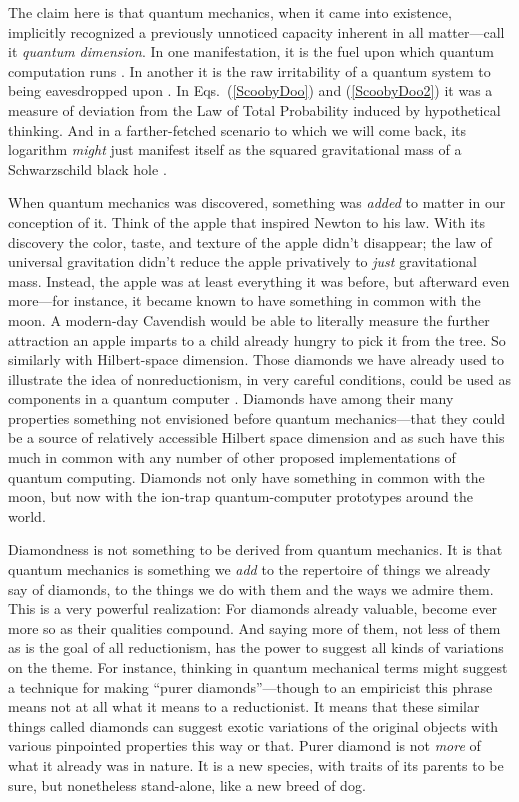 \documentclass[aps,pra,superscriptaddress,12pt,tightenlines,nofootinbib]{revtex4-2}
\begin{document}
The claim here is that quantum mechanics, when it came into existence, implicitly recognized a previously unnoticed capacity inherent in all matter---call it {\it quantum dimension}.  In one manifestation, it is the fuel upon which quantum computation runs \cite{Fuchs04b,BlumeKohout02}.  In another it is the raw irritability of a quantum system to being eavesdropped upon \cite{Fuchs03,Cerf02}.  In Eqs.~(\ref{ScoobyDoo}) and (\ref{ScoobyDoo2}) it was a measure of deviation from the Law of Total Probability induced by hypothetical thinking.  And in a farther-fetched scenario to which we will come back, its logarithm {\it might\/} just manifest itself as the squared gravitational mass of a Schwarzschild black hole \cite{Horowitz04,Gottesman04}.

When quantum mechanics was discovered, something was {\it added\/} to matter in our conception of it.  Think of the apple that inspired Newton to his law.  With its discovery the color, taste, and texture of the apple didn't disappear; the law of universal gravitation didn't reduce the apple privatively to {\it just\/} gravitational mass. Instead, the apple was at least everything it was before, but afterward even more---for instance, it became known to have something in common with the moon.  A modern-day Cavendish would be able to literally measure the fur\-ther attraction an apple imparts to a child already hungry to pick it from the tree.  So similarly with Hil\-bert-space dimension.  Those diamonds we have already used to illustrate the idea of nonreductionism, in very careful conditions, could be used as components in a quantum computer \cite{Prawer08}.  Diamonds have among their many properties something not envisioned before quantum mechanics---that they could be a source of relatively accessible Hilbert space dimension and as such have this much in common with any number of other proposed implementations of quantum computing.  Diamonds not only have something in common with the moon, but now with the ion-trap quantum-computer prototypes around the world.

Diamondness is not something to be derived from quantum mechanics.  It is that quantum mechanics is something we {\it add\/} to the repertoire of things we already say of diamonds, to the things we do with them and the ways we admire them.  This is a very powerful realization:  For diamonds already valuable, become ever more so as their qualities compound.  And saying more of them, not less of them as is the goal of all reductionism, has the power to suggest all kinds of variations on the theme.  For instance, thinking in quantum mechanical terms might suggest a technique for making ``purer diamonds''---though to an empiricist this phrase means not at all what it means to a reductionist.  It means that these similar things called diamonds can suggest exotic variations of the original objects with various pinpointed properties this way or that.  Purer diamond is not {\it more\/} of what it already was in nature.  It is a new species, with traits of its parents to be sure, but nonetheless stand-alone, like a new breed of dog.
\end{document}
